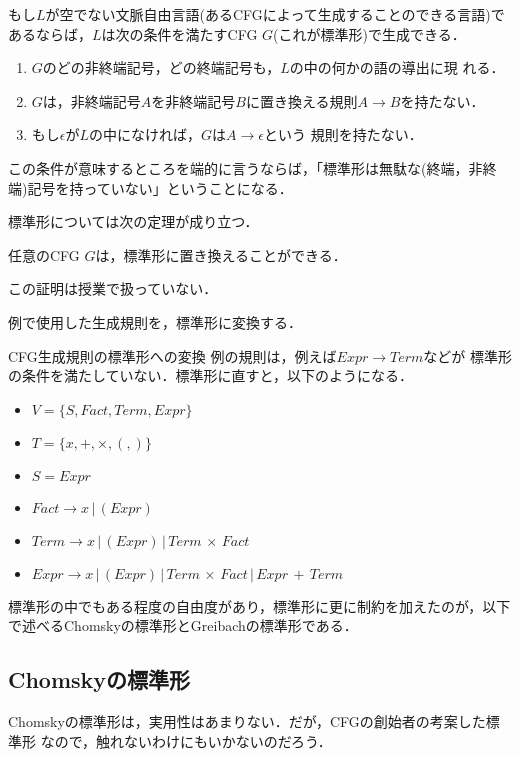もし$L$が空でない文脈自由言語(あるCFGによって生成することのできる言語)で
あるならば，$L$は次の条件を満たすCFG $G$(これが標準形)で生成できる．
\begin{enumerate}
 \item $G$のどの非終端記号，どの終端記号も，$L$の中の何かの語の導出に現
       れる．
 \item $G$は，非終端記号$A$を非終端記号$B$に置き換える規則$A \rightarrow
       B$を持たない．
 \item もし$\epsilon$が$L$の中になければ，$G$は$A \rightarrow \epsilon$という
       規則を持たない．
\end{enumerate}
この条件が意味するところを端的に言うならば，「標準形は無駄な(終端，非終
端)記号を持っていない」ということになる．

標準形については次の定理が成り立つ．

\begin{mytheorem}
 任意のCFG $G$は，標準形に置き換えることができる．
\end{mytheorem}

この証明は授業で扱っていない．

例で使用した生成規則を，標準形に変換する．

\begin{myexample}{CFG生成規則の標準形への変換}
 例の規則は，例えば$Expr \rightarrow Term$などが
 標準形の条件を満たしていない．標準形に直すと，以下のようになる．

\begin{itemize}
 \item $V = \{S, Fact, Term, Expr\}$
 \item $T = \{x, +, \times, (, )\}$
 \item $S = Expr$
 \item $Fact \rightarrow x\, |\, (Expr)$ 
 \item $Term \rightarrow x\, |\, (Expr)\, |\, Term\, \times\, Fact$
 \item $Expr \rightarrow x\, |\, (Expr)\, |\, Term\, \times\, Fact\, |\, Expr\, +\, Term$
\end{itemize}
\end{myexample}

標準形の中でもある程度の自由度があり，標準形に更に制約を加えたのが，以下
で述べるChomskyの標準形とGreibachの標準形である．

\subsection{Chomskyの標準形}
Chomskyの標準形は，実用性はあまりない．だが，CFGの創始者の考案した標準形
なので，触れないわけにもいかないのだろう．

